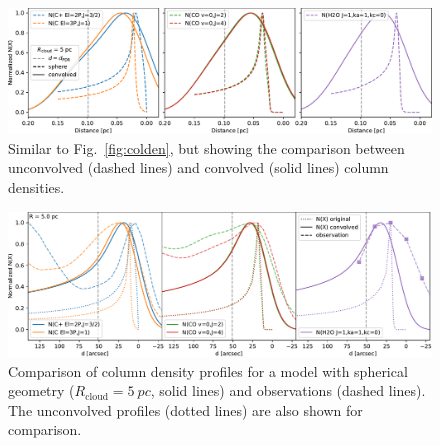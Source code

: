 \documentclass[12pt,a4paper]{article}
\newcommand{\mr}{\mathrm}
\begin{document}
\begin{figure}
    \centering
    \includegraphics[width=\textwidth,keepaspectratio]{convolved_column_densities.pdf}
    \caption{Similar to Fig.~\ref{fig:colden}, but showing the comparison between unconvolved (dashed lines) and convolved (solid lines) column densities.} \label{fig:convvcolden}
\end{figure}

\begin{figure}
    \centering
    \includegraphics[width=\textwidth,keepaspectratio]{colden_Rcloud5pc.pdf}
    \caption{Comparison of column density profiles for a model with spherical geometry ($R_\mr{cloud} = \qty{5}{pc}$, solid lines) and observations (dashed lines). The unconvolved profiles (dotted lines) are also shown for comparison.} \label{fig:colden_Rcloud5pc}
\end{figure}
\end{document}
